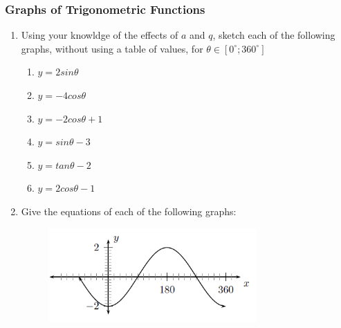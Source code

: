             \subsubsection{  Graphs of Trigonometric Functions }
            \nopagebreak
          \label{m39414*id91858}\begin{enumerate}[noitemsep, label=\textbf{\arabic*}. ] 
            \label{m39414*uid90}\item Using your knowldge of the effects of $a$ and $q$, sketch each of the following graphs, without using a table of values, for $\theta \in \left[{0}^{\circ };{360}^{\circ }\right]$\label{m39414*id91924}\begin{enumerate}[noitemsep, label=\textbf{\alph*}. ] 
            \label{m39414*uid91}\item $y=2sin\theta $\label{m39414*uid92}\item $y=-4cos\theta $\label{m39414*uid93}\item $y=-2cos\theta +1$\label{m39414*uid94}\item $y=sin\theta -3$\label{m39414*uid95}\item $y=tan\theta -2$\label{m39414*uid96}\item $y=2cos\theta -1$\end{enumerate}
                \label{m39414*uid97}\item Give the equations of each of the following graphs:
    \setcounter{subfigure}{0}
	\begin{figure}[H] %
    \begin{center}
    \label{m39414*id92152!!!underscore!!!media}\label{m39414*id92152!!!underscore!!!printimage}\includegraphics[width=300px]{col11306.imgs/m39414_trigrep4.png} %
      \vspace{2pt}
    \vspace{.1in}
    \end{center}
 \end{figure}       
    \setcounter{subfigure}{0}
	\begin{figure}[H] %
    \begin{center}

\end{center}
\end{figure}
\end{enumerate}
